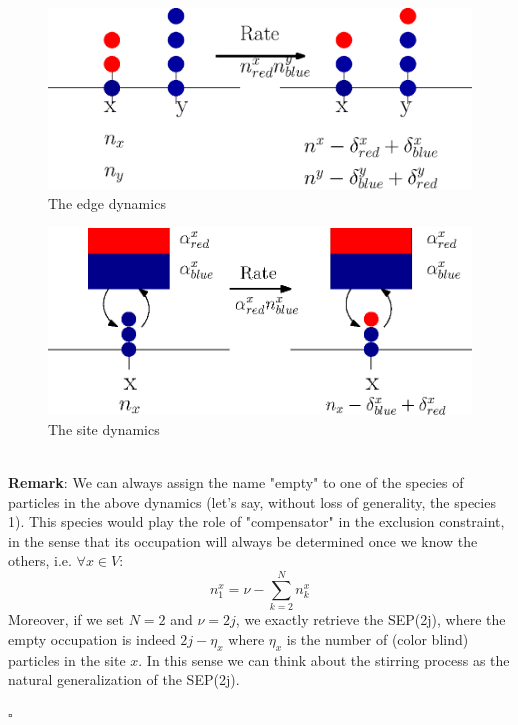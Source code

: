 \documentclass[11pt]{article}
\numberwithin{equation}{section}
\newcommand{\twoj}{\nu}
\begin{document}
\begin{figure}
    \centering
    \includegraphics[scale=0.6]{Dyn_stir.eps}
    \caption{The edge dynamics}
    \label{fig:1}
\end{figure}
\begin{figure}
    \centering
    \includegraphics[scale=0.88]{Dyn_stir_bordo.eps}
    \caption{The site dynamics}
    \label{fig:2}
\end{figure}\newline \\
\textbf{Remark}: 
    We can always assign the name "empty" to one of the species of particles in the above dynamics (let's say, without loss of generality, the species 1). This species would play the role of "compensator" in the exclusion constraint, in the sense that its occupation will always be determined once we know the others, i.e. $\forall x\in V$: 
    \begin{equation}
        n_{1}^{x}=\twoj-\sum_{k=2}^{N}n_{k}^{x}
    \end{equation}
    Moreover, if we set $N=2$ and $\twoj=2j$, we exactly retrieve the SEP(2j), where the empty occupation is indeed $2j-\eta_{x}$ where $\eta_{x}$ is the number of (color blind) particles in the site $x$. In this sense we can think about the stirring process as the natural generalization of the SEP(2j).
    \begin{flushright}
        $\square$
    \end{flushright}
\end{document}
